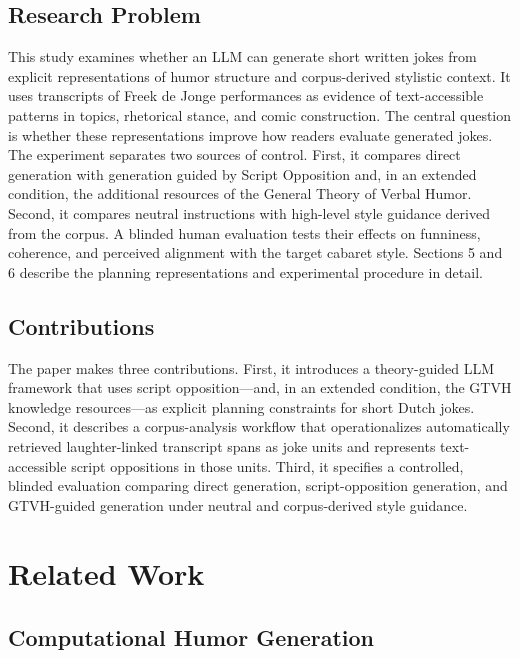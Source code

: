 \documentclass[11pt]{article}
\begin{document}
\subsection{Research Problem}\label{research-problem}

This study examines whether an LLM can generate short written jokes from explicit representations of humor structure and corpus-derived stylistic context. It uses transcripts of Freek de Jonge performances as evidence of text-accessible patterns in topics, rhetorical stance, and comic construction. The central question is whether these representations improve how readers evaluate generated jokes. The experiment separates two sources of control. First, it compares direct generation with generation guided by Script Opposition and, in an extended condition, the additional resources of the General Theory of Verbal Humor. Second, it compares neutral instructions with high-level style guidance derived from the corpus. A blinded human evaluation tests their effects on funniness, coherence, and perceived alignment with the target cabaret style. Sections 5 and 6 describe the planning representations and experimental procedure in detail.

\subsection{Contributions}\label{contributions}

The paper makes three contributions. First, it introduces a theory-guided LLM framework that uses script opposition---and, in an extended condition, the GTVH knowledge resources---as explicit planning constraints for short Dutch jokes. Second, it describes a corpus-analysis workflow that operationalizes automatically retrieved laughter-linked transcript spans as joke units and represents text-accessible script oppositions in those units. Third, it specifies a controlled, blinded evaluation comparing direct generation, script-opposition generation, and GTVH-guided generation under neutral and corpus-derived style guidance.

\section{Related Work}\label{related-work}

\subsection{Computational Humor Generation}\label{computational-humor-generation}
\end{document}
